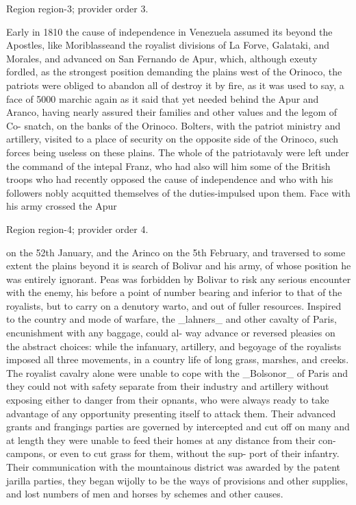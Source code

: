 \documentclass[11pt]{article}
\begin{document}
{\scriptsize\color{gray} Region region-3; provider order 3.\par}
\medskip

Early in 1810 the cause of independence in Venezuela assumed its beyond the Apostles, like Moriblasseand the royalist divisions of La Forve, Galataki, and Morales, and advanced on San Fernando de Apur, which, although exeuty fordled, as the strongest position demanding the plains west of the Orinoco, the patriots were obliged to abandon all of destroy it by fire, as it was used to say, a face of 5000 marchic again as it said that yet needed behind the Apur and Aranco, having nearly assured their families and other values and the legom of Co- snatch, on the banks of the Orinoco. Bolters, with the patriot ministry and artillery, visited to a place of security on the opposite side of the Orinoco, such forces being useless on these plains. The whole of the patriotavaly were left under the command of the intepal Franz, who had also will him some of the British troops who had recently opposed the cause of independence and who with his followers nobly acquitted themselves of the duties-impulsed upon them. Face with his army crossed the Apur
\par

{\scriptsize\color{gray} Region region-4; provider order 4.\par}
\medskip

on the 52th January, and the Arinco on the 5th February, and traversed to some extent the plains beyond it is search of Bolivar and his army, of whose position he was entirely ignorant. Peas was forbidden by Bolivar to risk any serious encounter with the enemy, his before a point of number bearing and inferior to that of the royalists, but to carry on a denutory warto, and out of fuller resources. Inspired to the country and mode of warfare, the \_lahners\_ and other cavalty of Paris, encunishment with any baggage, could al- way advance or reversed pleasies on the abstract choices: while the infanuary, artillery, and begoyage of the royalists imposed all three movements, in a country life of long grass, marshes, and creeks. The royalist cavalry alone were unable to cope with the \_Bolsonor\_ of Paris and they could not with safety separate from their industry and artillery without exposing either to danger from their opnants, who were always ready to take advantage of any opportunity presenting itself to attack them. Their advanced grants and frangings parties are governed by intercepted and cut off on many and at length they were unable to feed their homes at any distance from their con-campons, or even to cut grass for them, without the sup- port of their infantry. Their communication with the mountainous district was awarded by the patent jarilla parties, they began wijolly to be the ways of provisions and other supplies, and lost numbers of men and horses by schemes and other causes.
\par
\end{document}
